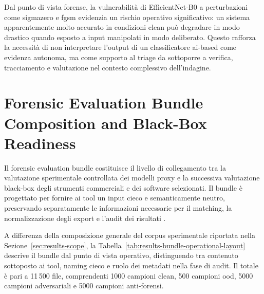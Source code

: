Dal punto di vista forense, la vulnerabilità di EfficientNet-B0 a perturbazioni
come \gls{sigmazero} e \gls{fgsm} evidenzia un rischio operativo significativo:
un sistema apparentemente molto accurato in condizioni clean può degradare in
modo drastico quando esposto a input manipolati in modo deliberato. Questo
rafforza la necessità di non interpretare l'output di un classificatore
\gls{ai}-based come evidenza autonoma, ma come supporto al triage da sottoporre
a verifica, tracciamento e valutazione nel contesto complessivo dell'indagine.



\section{Forensic Evaluation Bundle Composition and Black-Box Readiness}
\label{sec:results-bundle}

Il forensic evaluation bundle costituisce il livello di collegamento tra la
valutazione sperimentale controllata dei modelli proxy e la successiva
valutazione black-box degli strumenti commerciali e dei software selezionati. Il
bundle è progettato per fornire ai tool un input cieco e semanticamente neutro,
preservando separatamente le informazioni necessarie per il matching, la
normalizzazione degli export e l'audit dei risultati
\cite{casey2011digital,nist2006guide,iso27041,iso27042,swgde2014validation}.

A differenza della composizione generale del corpus sperimentale riportata nella
Sezione~\ref{sec:results-scope}, la
Tabella~\ref{tab:results-bundle-operational-layout} descrive il bundle dal punto
di vista operativo, distinguendo tra contenuto sottoposto ai tool, naming cieco e
ruolo dei metadati nella fase di audit. Il totale è pari a 11\,500 file,
comprendenti 1000 campioni clean, 500 campioni \gls{ood}, 5000 campioni
adversariali e 5000 campioni anti-forensi.

